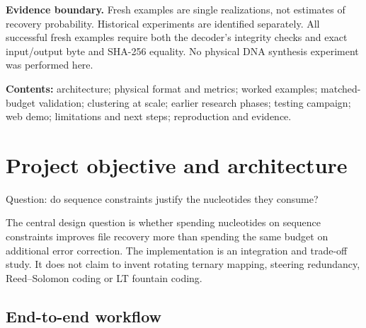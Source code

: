 \documentclass[11pt,a4paper]{article}
\newcommand{\note}[1]{\par\noindent\colorbox{light}{\parbox{\dimexpr\linewidth-2\fboxsep\relax}{\small #1}}\par}
\newcommand{\pageheading}[2]{\clearpage\section{#1}{\color{muted}\small #2}\par\vspace{5pt}}
\begin{document}
\note{\textbf{Evidence boundary.} Fresh examples are single realizations, not estimates of
recovery probability. Historical experiments are identified separately. All successful
fresh examples require both the decoder's integrity checks and exact input/output byte
and SHA-256 equality. No physical DNA synthesis experiment was performed here.}
\vfill
{\small\textbf{Contents:} architecture; physical format and metrics; worked examples;
matched-budget validation; clustering at scale; earlier research phases; testing campaign;
web demo; limitations and next steps; reproduction and evidence.}

\pageheading{Project objective and architecture}{Question: do sequence constraints justify the nucleotides they consume?}
The central design question is whether spending nucleotides on sequence constraints
improves file recovery more than spending the same budget on additional error correction.
The implementation is an integration and trade-off study. It does not claim to invent
rotating ternary mapping, steering redundancy, Reed--Solomon coding or LT fountain coding.

\subsection*{End-to-end workflow}
\begin{center}
\end{center}
\end{document}
